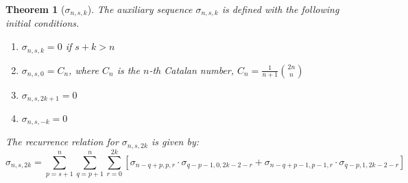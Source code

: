 \documentclass{article}
\newtheorem{theorem}{Theorem}
\begin{document}
\begin{theorem}[\(\sigma_{n, s, k}\)]
The auxiliary sequence \(\sigma_{n, s, k}\) is defined with the following initial conditions. 
\begin{enumerate}
    \item \(\sigma_{n, s, k} = 0\) if \(s + k > n\)
    \item \(\sigma_{n, s, 0} = C_n\), where \(C_n\) is the \(n\)-th Catalan number, \(C_n = \frac{1}{n + 1} \binom{2n}{n}\)
    \item \(\sigma_{n, s, 2k + 1} = 0\)
    \item \(\sigma_{n, s, -k} = 0\)
\end{enumerate}

The recurrence relation for \(\sigma_{n, s, 2k}\) is given by:
\begin{equation}
\sigma_{n, s, 2k} = 
\sum_{p = s + 1}^{n} 
\sum_{q = p + 1}^{n}
\sum_{r = 0}^{2k}
\left[
\sigma_{n - q + p, p, r} \cdot \sigma_{q - p - 1, 0, 2k - 2 - r}
+ 
\sigma_{n - q + p - 1, p - 1, r} \cdot \sigma_{q - p, 1, 2k - 2 - r}
\right]
\end{equation}
\end{theorem}
\end{document}
